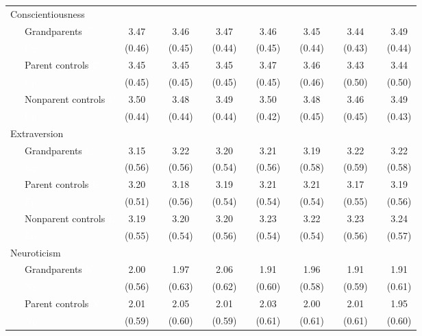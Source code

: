 \documentclass[
  english,
  man, noextraspace]{apa7}
\newenvironment{lltable}{\begin{landscape}\begin{center}\begin{ThreePartTable}}{\end{ThreePartTable}\end{center}\end{landscape}}
\begin{document}
\begin{appendix}
\begin{lltable}
{\begin{longtable}{lccccccccccccc}
Conscientiousness &  &  &  &  &  &  &  &  &  &  &  &  & \\
\ \ \ Grandparents \textcolor{white}{C} & 3.47 &  & 3.46 &  & 3.47 &  & 3.46 &  & 3.45 &  & 3.44 &  & 3.49\\
\ \ \ \textcolor{white}{Cg} & (0.46) &  & (0.45) &  & (0.44) &  & (0.45) &  & (0.44) &  & (0.43) &  & (0.44)\\
\ \ \ Parent controls \textcolor{white}{C} & 3.45 &  & 3.45 &  & 3.45 &  & 3.47 &  & 3.46 &  & 3.43 &  & 3.44\\
\ \ \ \textcolor{white}{Cp} & (0.45) &  & (0.45) &  & (0.45) &  & (0.45) &  & (0.46) &  & (0.50) &  & (0.50)\\
\ \ \ Nonparent controls \textcolor{white}{C} & 3.50 &  & 3.48 &  & 3.49 &  & 3.50 &  & 3.48 &  & 3.46 &  & 3.49\\
\ \ \ \textcolor{white}{Cn} & (0.44) &  & (0.44) &  & (0.44) &  & (0.42) &  & (0.45) &  & (0.45) &  & (0.43)\\
Extraversion &  &  &  &  &  &  &  &  &  &  &  &  & \\
\ \ \ Grandparents \textcolor{white}{E} & 3.15 &  & 3.22 &  & 3.20 &  & 3.21 &  & 3.19 &  & 3.22 &  & 3.22\\
\ \ \ \textcolor{white}{Eg} & (0.56) &  & (0.56) &  & (0.54) &  & (0.56) &  & (0.58) &  & (0.59) &  & (0.58)\\
\ \ \ Parent controls \textcolor{white}{E} & 3.20 &  & 3.18 &  & 3.19 &  & 3.21 &  & 3.21 &  & 3.17 &  & 3.19\\
\ \ \ \textcolor{white}{Ep} & (0.51) &  & (0.56) &  & (0.54) &  & (0.54) &  & (0.54) &  & (0.55) &  & (0.56)\\
\ \ \ Nonparent controls \textcolor{white}{E} & 3.19 &  & 3.20 &  & 3.20 &  & 3.23 &  & 3.22 &  & 3.23 &  & 3.24\\
\ \ \ \textcolor{white}{En} & (0.55) &  & (0.54) &  & (0.56) &  & (0.54) &  & (0.54) &  & (0.56) &  & (0.57)\\
Neuroticism &  &  &  &  &  &  &  &  &  &  &  &  & \\
\ \ \ Grandparents \textcolor{white}{N} & 2.00 &  & 1.97 &  & 2.06 &  & 1.91 &  & 1.96 &  & 1.91 &  & 1.91\\
\ \ \ \textcolor{white}{Ng} & (0.56) &  & (0.63) &  & (0.62) &  & (0.60) &  & (0.58) &  & (0.59) &  & (0.61)\\
\ \ \ Parent controls \textcolor{white}{N} & 2.01 &  & 2.05 &  & 2.01 &  & 2.03 &  & 2.00 &  & 2.01 &  & 1.95\\
\ \ \ \textcolor{white}{Np} & (0.59) &  & (0.60) &  & (0.59) &  & (0.61) &  & (0.61) &  & (0.61) &  & (0.60)\\

\end{longtable}}
\end{lltable}
\end{appendix}
\end{document}
